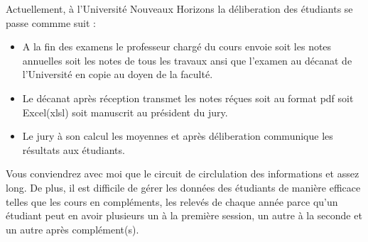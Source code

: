 Actuellement, à l'Université Nouveaux Horizons
la déliberation des étudiants se passe commme suit :

\begin{itemize}
    \item A la fin des examens le professeur chargé du cours envoie soit 
    les notes annuelles soit les notes de tous les travaux ansi que 
    l'examen au décanat de l'Université en copie au doyen de la faculté.
    \item Le décanat après réception transmet les notes réçues soit
    au format pdf soit Excel(xlsl) soit manuscrit au président du jury.
    \item Le jury à son calcul les moyennes et après déliberation
    communique les résultats aux étudiants.
\end{itemize}

Vous conviendrez avec moi que le circuit de circlulation des
informations et assez long. De plus, il est difficile de
gérer les données des étudiants de manière efficace telles que les 
cours en compléments, les relevés de chaque année parce qu'un 
étudiant peut en avoir plusieurs un à la première session, 
un autre à la seconde et un autre après complément(s).
